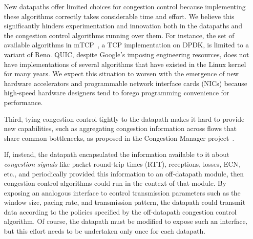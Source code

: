 New datapaths offer limited choices for congestion control because implementing these algorithms correctly takes considerable time and effort. 
We believe this significantly hinders experimentation and innovation both in the datapaths and the congestion control algorithms running over them.
For instance, the set of available algorithms in mTCP~\cite{mtcp}, a TCP implementation on DPDK, is limited to a variant of Reno. 
QUIC, despite Google's imposing engineering resources, does not have implementations of several algorithms that have existed in the Linux kernel for many years.  
We expect this situation to worsen with the emergence of new hardware accelerators and programmable network interface cards (NICs) because high-speed hardware designers tend to forego programming convenience for performance. 

Third, tying congestion control tightly to the datapath makes it hard to provide new capabilities, such as aggregating congestion information across flows that share common bottlenecks, as proposed in the Congestion Manager project~\cite{cm}. 


\smallskip
If, instead, the datapath encapsulated the information available to it about {\em congestion signals} like packet round-trip times (RTT), receptions, losses, ECN, etc., and periodically provided this information to an off-datapath module, then congestion control algorithms could run in the context of that module. 
By exposing an analogous interface to control transmission parameters such as the window size, pacing rate, and transmission pattern, the datapath could transmit data according to the policies specified by the off-datapath congestion control algorithm. Of course, the datapath must be modified to expose
such an interface, but this effort needs to be undertaken only once for each datapath.

